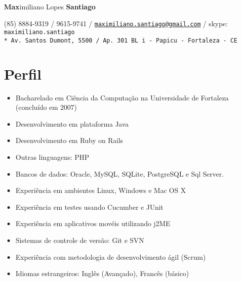 \documentclass[letterpaper]{article}
\def\name{\textbf{Max}imiliano Lopes \textbf{Santiago}}
\begin{document}
\begin{flushright}

{\huge \name}

\vspace{0.05in}
(85) 8884-9319 / 9615-9741 / \href{mailto:maximiliano.santiago@gmail.com}{\tt maximiliano.santiago@gmail.com} / skype: \tt maximiliano.santiago
\vspace{0.01in} \\* 
Av. Santos Dumont, 5500 / Ap. 301 BL i - Papicu - Fortaleza - CE

\end{flushright}

\section*{Perfil}
\begin{itemize}
  \item Bacharelado em Ciência da Computação na Universidade de Fortaleza (concluído em 2007)
  \item Desenvolvimento em plataforma Java
  \item Desenvolvimento em Ruby on Rails
  \item Outras linguagens: PHP 
  \item Bancos de dados: Oracle, MySQL, SQLite, PostgreSQL e Sql Server.
  \item Experiência em ambientes Linux, Windows e Mac OS X
  \item Experiência em testes usando Cucumber e JUnit
  \item Experiência em aplicativos movéis utilizando j2ME
  \item Sistemas de controle de versão: Git e SVN
  \item Experiência com metodologia de desenvolvimento ágil (Scrum)
  \item Idiomas estrangeiros: Inglês (Avançado), Francês (básico)
\end{itemize}
\end{document}
